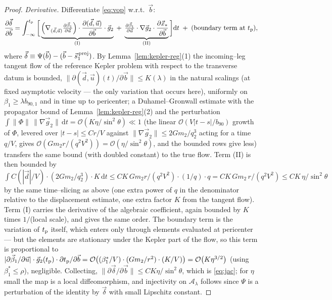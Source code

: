 \documentclass[11pt]{article}
\newcommand{\dd}{\mathrm{d}}
\newcommand{\bv}{\vec b}
\newcommand{\bnt}{b_{90}}
\newcommand{\order}[1]{\mathcal O\!\left(#1\right)}
\begin{document}
\begin{proof}
\emph{Derivative.} Differentiate \eqref{eq:vop} w.r.t.\ $\bv$:
\begin{equation}
  \frac{\partial\vec\delta}{\partial\bv}
  =\int_{-\infty}^{t_{\rm p}}\bigg[
  \underbrace{\Big(\nabla_{(\vec d,\vec u)}\tfrac{\partial\vec\beta_1}{\partial\vec u}\Big)
  \cdot\frac{\partial(\vec d,\vec u)}{\partial\bv}\cdot\vec g_2}_{\rm (I)}
  \;+\;
  \underbrace{\tfrac{\partial\vec\beta_1}{\partial\vec u}\cdot\nabla\vec g_2\cdot
  \frac{\partial\vec x_*}{\partial\bv}}_{\rm (II)}
  \bigg]\dd t
  \;+\;(\text{boundary term at }t_{\rm p}),
  \label{eq:ddelta}
\end{equation}
where $\vec\delta\equiv\Psi(\bv)-(\bv-\vec s_1^{\,\rm proj})$. By Lemma~\ref{lem:kepler-reg}(1)
the incoming--leg tangent flow of the reference Kepler problem with respect to the transverse
datum is bounded, $\|\partial(\vec d,\vec u)(t)/\partial\bv\|\le K(\lambda)$ in the natural
scalings (at fixed asymptotic velocity --- the only variation that occurs here), uniformly on
$\beta_1\ge\lambda b_{90,1}$ and in time up to pericenter; a Duhamel--Gronwall estimate with the
propagator bound of Lemma~\ref{lem:kepler-reg}(2) and the perturbation
$\int\|\Phi\|\,\|\nabla\vec g_2\|\,\dd t=\order{K\eta/\sin^2\theta}\ll1$ (the linear
$\order{V|t-s|/\bnt}$ growth of $\Phi$, levered over $|t-s|\le Cr/V$ against
$\|\nabla\vec g_2\|\le 2Gm_2/q_2^3$ acting for a time $q/V$, gives $\order{Gm_2r/(q^2V^2)}
=\order{\eta/\sin^2\theta}$, and the bounded rows give less) transfers the same
bound (with doubled constant) to the true flow. Term (II) is then bounded by
$\int C(|\vec d|/V)\cdot(2Gm_2/q_2^3)\cdot K\,\dd t\le CK\,Gm_2 r/(q^2V^2)\cdot(1/q)\cdot q
= CK\,Gm_2\,r/(q^2V^2)\le CK\,\eta/\sin^2\theta$ by the same time--slicing as above (one extra power
of $q$ in the denominator relative to the displacement estimate, one extra factor $K$ from the
tangent flow). Term (I) carries the derivative of the algebraic coefficient, again bounded by
$K$ times $1/$(local scale), and gives the same order. The boundary term is the variation of
$t_{\rm p}$ itself, which enters only through elements evaluated at pericenter --- but the elements
are stationary under the Kepler part of the flow, so this term is proportional to
$|\partial\vec\beta_1/\partial\vec u|\cdot\vec g_2(t_{\rm p})\cdot\partial t_{\rm p}/\partial\bv
=\order{(\beta_1^*/V)\cdot(Gm_2/r^2)\cdot(K/V)}=\order{K\eta^{3/2}}$ (using $\beta_1^*\le\rho$),
negligible. Collecting, $\|\partial\vec\delta/\partial\bv\|\le
CK\eta/\sin^2\theta$, which is \eqref{eq:jac}; for $\eta$ small the map is a local
diffeomorphism, and injectivity on $\mathcal A_\lambda$ follows since $\Psi$ is a perturbation of
the identity by $\vec\delta$ with small Lipschitz constant.
\end{proof}
\end{document}
